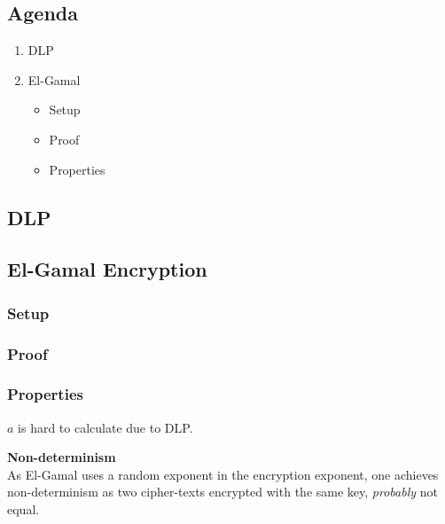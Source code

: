 

\subsection*{Agenda}
\begin{enumerate}
\item DLP
\item El-Gamal
  \begin{itemize}
  \item Setup
  \item Proof
  \item Properties
  \end{itemize}
\end{enumerate}

\subsection{DLP}


\subsection{El-Gamal Encryption}
\subsubsection*{Setup}


\subsubsection*{Proof}


\subsubsection*{Properties}
$a$ is hard to calculate due to DLP.

\textbf{Non-determinism} \\
As El-Gamal uses a random exponent in the encryption exponent, one
achieves non-determinism as two cipher-texts encrypted with the same
key, \emph{probably} not equal.
